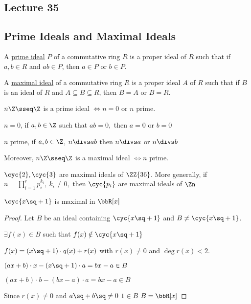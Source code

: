 \subsection*{Lecture 35} %
\subsection{Prime Ideals and Maximal Ideals}
\begin{definition}
  A \uline{prime ideal} \( P \) of a commutative ring \( R \) is a proper ideal of \( R \) such that if \( a,b\in R \) and \( ab\in P \), then \( a\in P \) or \( b\in P \).

  A \uline{maximal ideal} of a commutative ring \( R \) is a proper ideal \( A \) of \( R \) such that if \( B \) is an ideal of \( R \) and \( A\subseteq B\subseteq R \), then \( B=A \) or \( B=R \).
\end{definition}

\begin{example}
  \( n\Z \sseq \Z \) is a prime ideal \( \iff n=0 \) or \( n \) prime.

  \begin{note}
    \( n = 0 \), if \( a,b\in \Z \) such that \( ab = 0, \) then \( a=0 \) or \( b=0 \) \checkmark

    \( n \) prime, if \( a,b\in\Z \), \( n\divs ab \) then \( n\divs a  \) or \( n\divs b \) \checkmark
  \end{note}
  Moreover, \( n\Z\sseq\Z \) is a maximal ideal \( \iff n \) prime.
\end{example}

\begin{example}
  \( \cyc{2}, \cyc{3} \) are maximal ideals of \( \ZZ{36} \). More generally, if \( n=\prod_{i=1}^{r} p_{i}^{k_{i}},\ k_i\neq 0,\) then \( \cyc{p_i} \) are maximal ideals of \( \Zn \)
\end{example}

\begin{example}
  \( \cyc{x\sq +1} \) is maximal in \( \bbR[x] \)
\end{example}

\begin{proof}
  Let \( B \) be an ideal containing \( \cyc{x\sq + 1} \) and \( B\neq \cyc{x\sq + 1} \).

  \imp \( \exists f(x) \in B \) such that \( f(x) \notin \cyc{x\sq + 1} \)

  \imp \( f(x) = (x\sq+1) \cdot q(x) + r(x) \) with \( r(x)\neq 0 \) and \( \deg r(x) <2 \).

  \imp \( (ax+b) \cdot x - (x\sq+1)\cdot a = bx-a \in B \)

  \imp \( (ax+b) \cdot b - (bx-a)\cdot a = bx-a \in B \)

  Since \( r(x) \neq 0 \) and \( a\sq+b\sq \neq 0 \) \imp \( 1\in B \) \imp \( B = \bbR[x] \)
\end{proof}


